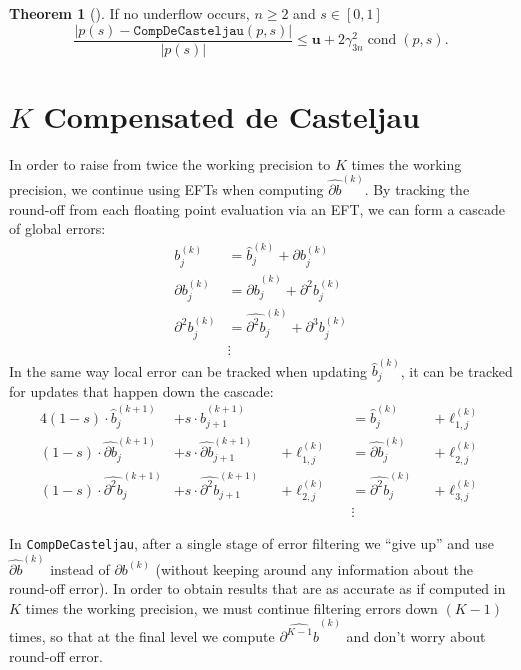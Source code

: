 \documentclass[letterpaper,10pt]{article}
\theoremstyle{definition}
\newtheorem{theorem}{Theorem}
\newcommand{\cond}[1]{\operatorname{cond}\left(#1\right)}
\newcommand{\mach}{\mathbf{u}}
\begin{document}
\begin{theorem}[\cite{Jiang2010}]
  If no underflow occurs, \(n \geq 2\) and \(s \in \left[0, 1\right]\)
  \begin{equation}
    \frac{\left|p(s) - \mathtt{CompDeCasteljau}(p, s)\right|}{\left|p(s)\right|} \leq \mach +
    2 \gamma_{3n}^2 \cond{p, s}.
  \end{equation}
\end{theorem}

\section{\texorpdfstring{\(K\)}{K} Compensated de Casteljau}\label{compensated-k}

In order to raise from twice the working precision to \(K\) times the
working precision, we continue using EFTs when computing
\(\widehat{\partial b}^{(k)}\). By tracking the round-off from each
floating point evaluation via an EFT, we can form a cascade of global errors:
\begin{align}
  b_j^{(k)} &= \widehat{b}_j^{(k)} + \partial b_j^{(k)} \\
  \partial b_j^{(k)} &= \widehat{\partial b}_j^{(k)} + \partial^2 b_j^{(k)} \\
  \partial^2 b_j^{(k)} &= \widehat{\partial^2 b}_j^{(k)} +
  \partial^3 b_j^{(k)} \\
  & \vdots \nonumber
\end{align}
In the same way local error can be tracked when updating
\(\widehat{b}_j^{(k)}\), it can be tracked for updates that happen down
the cascade:
\begin{alignat}{4}
  (1 - s) \cdot \widehat{b}_j^{(k + 1)} &+
  s \cdot \widehat{b}_{j + 1}^{(k + 1)} &&  &&=
  \widehat{b}_j^{(k)} &&+ \ell_{1, j}^{(k)} \\
  (1 - s) \cdot \widehat{\partial b}_j^{(k + 1)} &+
  s \cdot \widehat{\partial b}_{j + 1}^{(k + 1)} &&+ \ell_{1, j}^{(k)} &&=
  \widehat{\partial b}_j^{(k)} &&+ \ell_{2, j}^{(k)} \\
  (1 - s) \cdot \widehat{\partial^2 b}_j^{(k + 1)} &+
  s \cdot \widehat{\partial^2 b}_{j + 1}^{(k + 1)} &&+ \ell_{2, j}^{(k)} &&=
  \widehat{\partial^2 b}_j^{(k)} &&+ \ell_{3, j}^{(k)} \\
  &  &&  &&\vdots && \nonumber
\end{alignat}

In \texttt{CompDeCasteljau}, after a single stage of error filtering we
``give up'' and use \(\widehat{\partial b}^{(k)}\) instead of
\(\partial b^{(k)}\) (without keeping around any information about the
round-off error). In order to obtain results that are as accurate as if
computed in \(K\) times the working precision, we must continue filtering
errors down \((K - 1)\) times, so that at the final level we compute
\(\widehat{\partial^{K - 1} b}^{(k)}\) and don't worry about round-off
error.
\end{document}
